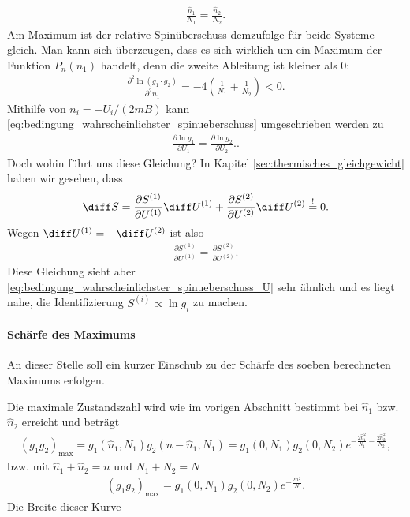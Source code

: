 \begin{align*}
    \frac{\hat{n}_1}{N_1} = \frac{\hat{n}_2}{N_2} . 
\end{align*}
Am Maximum ist der relative Spinüberschuss demzufolge für beide Systeme gleich. Man kann sich überzeugen, dass es sich wirklich um ein Maximum der Funktion $P_n(n_1)$ handelt, denn die zweite Ableitung ist kleiner als $0$:
\begin{align*}
    \frac{\partial ^2\ln(g_1\cdot g_2)}{\partial ^2n_1} = -4\left( \frac{1}{N_1}+\frac{1}{N_2} \right) < 0.
\end{align*}
Mithilfe von $n_i= -U_i/(2mB)$ kann \eqref{eq:bedingung_wahrscheinlichster_spinueberschuss} umgeschrieben werden zu
\begin{align}
    \label{eq:bedingung_wahrscheinlichster_spinueberschuss_U}
    \boxed{\frac{\partial \ln g_1}{\partial U_1}  = \frac{\partial \ln g_2}{\partial U_2} .}. 
\end{align}
Doch wohin führt uns diese Gleichung? In Kapitel \ref{sec:thermisches_gleichgewicht} haben wir gesehen, dass 
\begin{align*}
    \diff S = \frac{\partial S^{(1)}}{\partial U^{(1)}}\diff U^{(1)}+ \frac{\partial S^{(2)}}{\partial U^{(2)}}\diff U^{(2)} \overset{!}{=}0. 
\end{align*}
Wegen $\diff U^{(1)} = -\diff U^{(2)}$ ist also 
\begin{align*}
    \frac{\partial S^{(1)}}{\partial U^{(1)}} = \frac{\partial S^{(2)}}{\partial U^{(2)}}. 
\end{align*}
Diese Gleichung sieht aber \eqref{eq:bedingung_wahrscheinlichster_spinueberschuss_U} sehr ähnlich und es liegt nahe, die Identifizierung $S^{(i)}\propto \ln g_i$ zu machen. 


\paragraph*{Schärfe des Maximums}

An dieser Stelle soll ein kurzer Einschub zu der Schärfe des soeben berechneten Maximums erfolgen. 

Die maximale Zustandszahl wird wie im vorigen Abschnitt bestimmt bei $\hat{n}_1$ bzw. $\hat{n}_2$ erreicht und beträgt 
\begin{align*}
    (g_1g_2)_\mathrm{max} = g_1(\hat{n}_1,N_1)g_2(n-\hat{n}_1,N_1) = g_1(0,N_1)g_2(0,N_2) e^{-\frac{2\hat{n}_1^2}{N_1}-\frac{2\hat{n}_2^2}{N_2}},
\end{align*}
bzw. mit $\hat{n}_1+\hat{n}_2=n$ und $N_1+N_2=N$
\begin{align*}
    (g_1g_2)_\mathrm{max} = g_1(0,N_1)g_2(0,N_2) e^{-\frac{2n^2}{N}}. 
\end{align*}
Die Breite dieser Kurve %